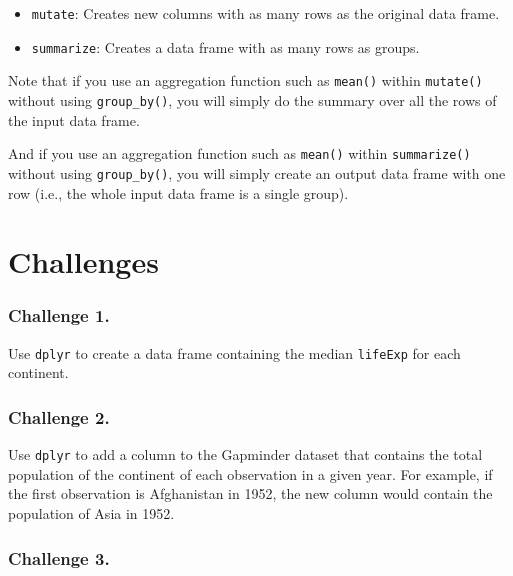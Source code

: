 \documentclass[
]{book}
\providecommand{\tightlist}{%
  \setlength{\itemsep}{0pt}\setlength{\parskip}{0pt}}
\begin{document}
\begin{itemize}
\tightlist
\item
  \texttt{mutate}: Creates new columns with as many rows as the original data frame.
\item
  \texttt{summarize}: Creates a data frame with as many rows as groups.
\end{itemize}

Note that if you use an aggregation function such as \texttt{mean()} within \texttt{mutate()} without using \texttt{group\_by()}, you will simply do the summary over all the rows of the input data frame.

And if you use an aggregation function such as \texttt{mean()} within \texttt{summarize()} without using \texttt{group\_by()}, you will simply create an output data frame with one row (i.e., the whole input data frame is a single group).

\hypertarget{challenges-6}{%
\section{Challenges}\label{challenges-6}}

\hypertarget{challenge-1.-3}{%
\subsubsection*{Challenge 1.}\label{challenge-1.-3}}

Use \texttt{dplyr} to create a data frame containing the median \texttt{lifeExp} for each continent.

\hypertarget{challenge-2.-2}{%
\subsubsection*{Challenge 2.}\label{challenge-2.-2}}

Use \texttt{dplyr} to add a column to the Gapminder dataset that contains the total population of the continent of each observation in a given year. For example, if the first observation is Afghanistan in 1952, the new column would contain the population of Asia in 1952.

\hypertarget{challenge-3.-2}{%
\subsubsection*{Challenge 3.}\label{challenge-3.-2}}
\end{document}
